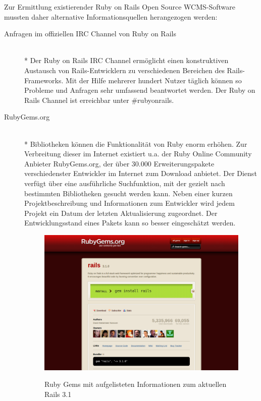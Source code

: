 Zur Ermittlung existierender Ruby on Rails Open Source WCMS-Software mussten daher alternative Informationsquellen herangezogen werden:
\begin{description}
\item[Anfragen im offiziellen IRC Channel von Ruby on Rails]\mbox{~}\\*
Der Ruby on Rails IRC Channel ermöglicht einen konstruktiven Austausch von Rails-Entwicklern zu verschiedenen Bereichen des Rails-Frameworks. Mit der Hilfe mehrerer hundert Nutzer täglich können so Probleme und Anfragen sehr umfassend beantwortet werden. Der Ruby on Rails Channel ist erreichbar unter \#rubyonrails.
\item[RubyGems.org]\mbox{~}\\*
Bibliotheken können die Funktionalität von Ruby enorm erhöhen. Zur Verbreitung dieser im Internet existiert u.a. der Ruby Online Community Anbieter RubyGems.org, der über 30.000 Erweiterungspakete verschiedenster Entwickler im Internet zum Download anbietet.
Der Dienst verfügt über eine ausführliche Suchfunktion, mit der gezielt nach bestimmten Bibliotheken gesucht werden kann. Neben einer kurzen Projektbeschreibung und Informationen zum Entwickler wird jedem Projekt ein Datum der letzten Aktualisierung zugeordnet. Der Entwicklungsstand eines Pakets kann so besser eingeschätzt werden.
\begin{figure}[!h]
\begin{center}
\label{fig.rubygems}
\includegraphics[scale=0.3]{images/analyse/rubygems/railsonrubygems.png}
\caption{Ruby Gems mit aufgelisteten Informationen zum aktuellen Rails 3.1}
\end{center}
\end{figure}

\end{description}

